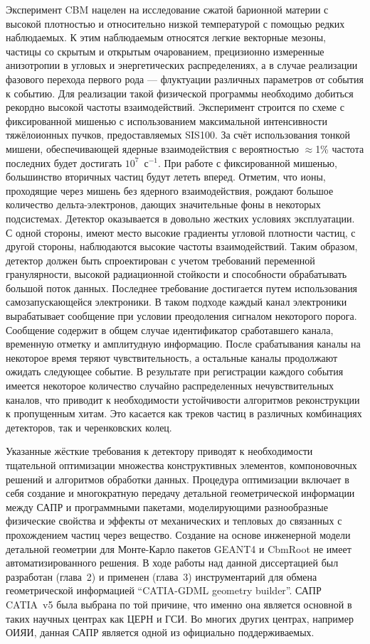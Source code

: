 Эксперимент CBM нацелен на исследование сжатой барионной материи с высокой плотностью и относительно низкой температурой с помощью редких наблюдаемых. К этим наблюдаемым относятся легкие векторные мезоны, частицы со скрытым и открытым очарованием, прецизионно измеренные анизотропии в угловых и энергетических распределениях, а в случае реализации фазового перехода первого рода --- флуктуации различных параметров от события к событию. Для реализации такой физической программы необходимо добиться рекордно высокой частоты взаимодействий. Эксперимент строится по схеме с фиксированной мишенью
с использованием максимальной интенсивности тяжёлоионных пучков, предоставляемых SIS100.
За счёт использования тонкой мишени, обеспечивающей ядерные взаимодействия с вероятностью $\approx$1\% частота последних будет достигать $10^7$~с$^{-1}$. При работе с фиксированной мишенью, большинство вторичных частиц будут лететь вперед. Отметим, что ионы, проходящие через мишень без ядерного взаимодействия, рождают большое количество дельта-электронов, дающих значительные фоны в некоторых подсистемах. Детектор оказывается в довольно жестких условиях эксплуатации. С одной стороны, имеют место высокие градиенты угловой плотности частиц, с другой стороны, наблюдаются высокие частоты взаимодействий. Таким образом, детектор должен быть спроектирован с учетом требований переменной гранулярности, высокой радиационной стойкости и способности обрабатывать большой поток данных. Последнее требование достигается путем использования самозапускающейся электроники. В таком подходе каждый канал электроники вырабатывает сообщение при условии преодоления сигналом некоторого порога. Сообщение содержит в общем случае идентификатор сработавшего канала, временную отметку и амплитудную информацию. После срабатывания каналы на некоторое время теряют чувствительность, а остальные каналы продолжают ожидать следующее событие. В результате при регистрации каждого события имеется некоторое количество случайно распределенных нечувствительных каналов, что приводит к необходимости устойчивости алгоритмов реконструкции к пропущенным хитам. Это касается как треков частиц в различных комбинациях детекторов, так и черенковских колец.

Указанные жёсткие требования к детектору приводят к необходимости тщательной оптимизации множества конструктивных элементов, компоновочных решений и алгоритмов обработки данных. Процедура оптимизации включает в себя создание и многократную передачу детальной геометрической информации между САПР и программными пакетами, моделирующими разнообразные физические свойства и эффекты от механических и тепловых до связанных с прохождением частиц через вещество. Создание на основе инженерной модели детальной геометрии для Монте-Карло пакетов GEANT4 и CbmRoot не имеет автоматизированного решения. В ходе работы над данной диссертацией был разработан (глава~2) и применен (глава~3) инструментарий для обмена геометрической информацией ``CATIA-GDML geometry builder''. САПР CATIA~v5 была выбрана по той причине, что именно она является основной в таких научных центрах как ЦЕРН и ГСИ. Во многих других центрах, например ОИЯИ, данная САПР является одной из официально поддерживаемых.

